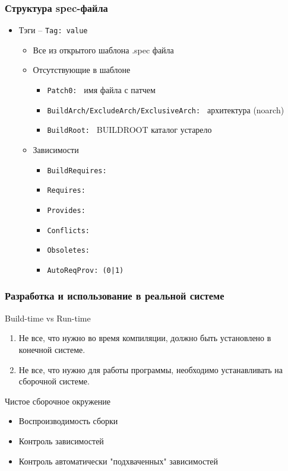 \begin{frame}
	\frametitle{Структура spec-файла}	
	\begin{itemize}
		\item Тэги -- {\tt Tag: value}
		\begin{itemize}
		\item Все из открытого шаблона .spec файла
		\item Отсутствующие в шаблоне
			\begin{itemize}
			\item {\tt Patch0: } имя файла с патчем
			\item {\tt BuildArch/ExcludeArch/ExclusiveArch: } архитектура (noarch)
			\item {\tt BuildRoot: } BUILDROOT каталог устарело
			\end{itemize}
		\item Зависимости
			\begin{itemize}
			\item {\tt BuildRequires:}
			\item {\tt Requires:}
			\item {\tt Provides:}
			\item {\tt Conflicts:}
			\item {\tt Obsoletes:}
			\item {\tt AutoReqProv: (0|1)}
			\end{itemize}
		\end{itemize}
	\end{itemize}
\end{frame}

\begin{frame}
	\frametitle{Разработка и использование в реальной системе}
	
	\begin{block}{Build-time vs Run-time}

		\begin{enumerate}
			\item Не все, что нужно во время компиляции, должно быть установлено в конечной системе.
			\item Не все, что нужно для работы программы, необходимо устанавливать на сборочной системе.
		\end{enumerate}
	\end{block}
	\begin{block}{Чистое сборочное окружение}
		\begin{itemize}
			\item Воспроизводимость сборки 
			\item Контроль зависимостей
			\item Контроль автоматически "подхваченных" зависимостей
		\end{itemize}
	\end{block}
\end{frame}

